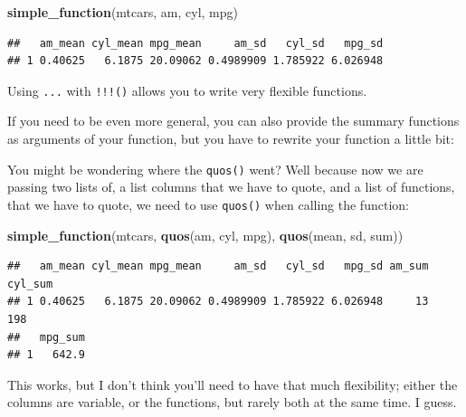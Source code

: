 \documentclass[]{gitbook}
\newenvironment{Shaded}{\begin{snugshade}}{\end{snugshade}}
\newcommand{\ControlFlowTok}[1]{\textcolor[rgb]{0.13,0.29,0.53}{\textbf{#1}}}
\newcommand{\KeywordTok}[1]{\textcolor[rgb]{0.13,0.29,0.53}{\textbf{#1}}}
\newcommand{\NormalTok}[1]{#1}
\newcommand{\OperatorTok}[1]{\textcolor[rgb]{0.81,0.36,0.00}{\textbf{#1}}}
\newcommand{\StringTok}[1]{\textcolor[rgb]{0.31,0.60,0.02}{#1}}
\theoremstyle{definition}
\theoremstyle{definition}
\theoremstyle{definition}
\theoremstyle{remark}
\begin{document}
\begin{Shaded}
\begin{Highlighting}[]
\KeywordTok{simple_function}\NormalTok{(mtcars, am, cyl, mpg)}
\end{Highlighting}
\end{Shaded}

\begin{verbatim}
##   am_mean cyl_mean mpg_mean     am_sd   cyl_sd   mpg_sd
## 1 0.40625   6.1875 20.09062 0.4989909 1.785922 6.026948
\end{verbatim}

Using \texttt{...} with \texttt{!!!()} allows you to write very flexible
functions.

If you need to be even more general, you can also provide the summary
functions as arguments of your function, but you have to rewrite your
function a little bit:

\begin{Shaded}
\end{Shaded}

You might be wondering where the \texttt{quos()} went? Well because now
we are passing two lists of, a list columns that we have to quote, and a
list of functions, that we have to quote, we need to use \texttt{quos()}
when calling the function:

\begin{Shaded}
\begin{Highlighting}[]
\KeywordTok{simple_function}\NormalTok{(mtcars, }\KeywordTok{quos}\NormalTok{(am, cyl, mpg), }\KeywordTok{quos}\NormalTok{(mean, sd, sum))}
\end{Highlighting}
\end{Shaded}

\begin{verbatim}
##   am_mean cyl_mean mpg_mean     am_sd   cyl_sd   mpg_sd am_sum cyl_sum
## 1 0.40625   6.1875 20.09062 0.4989909 1.785922 6.026948     13     198
##   mpg_sum
## 1   642.9
\end{verbatim}

This works, but I don't think you'll need to have that much flexibility;
either the columns are variable, or the functions, but rarely both at
the same time. I guess.
\end{document}
